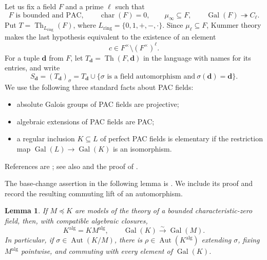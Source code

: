 \documentclass[11pt,a4paper]{amsart}
\newtheorem{lemma}[theorem]{Lemma}
\theoremstyle{definition}
\newcommand{\alg}{\mathrm{alg}}
\newcommand{\bd}{\boldsymbol d}
\DeclareMathOperator{\Gal}{Gal}
\DeclareMathOperator{\Aut}{Aut}
\DeclareMathOperator{\Th}{Th}
\begin{document}
Let us fix a field $F$ and a prime $\ell$ such that
\begin{equation}\label{b:eq:hyp}
F\text{ is bounded and PAC},\qquad
\operatorname{char}(F)=0,\qquad \mu_\infty\subseteq F,
\qquad \Gal(F)\twoheadrightarrow C_\ell.
\end{equation}
Put $T=\Th_{L_{\mathrm{ring}}}(F)$, where
$L_{\mathrm{ring}}=\{0,1,+,-,\cdot\}$. Since $\mu_\ell\subseteq F$,
Kummer theory makes the last hypothesis equivalent to the existence of
an element
\begin{equation}\label{b:eq:c}
c\in F^\times\setminus(F^\times)^\ell.
\end{equation}
For a tuple $\bd$ from $F$, let $T_{\bd}=\Th(F,\bd)$ in the language
with names for its entries, and write
\[
S_{\bd}=(T_{\bd})_\sigma
=T_{\bd}\cup\{\sigma\text{ is a field automorphism and}\ \sigma(\bd)=\bd\}.
\]
We use the following three standard facts about PAC fields:
\begin{itemize}
  \item absolute Galois groups of PAC
fields are projective;
  \item algebraic extensions of PAC fields are PAC;
  \item a regular inclusion $K\subseteq L$ of perfect PAC fields is elementary if the
restriction map $\Gal(L)\to\Gal(K)$ is an isomorphism.
\end{itemize}
References are \cite[Corollary 11.2.5, Theorem 11.6.2, Corollary 20.3.4]{FJ}; see also \cite[Section 4.3]{CP} and the proof of \cite[Theorem 3.25]{HK}.

The base-change assertion in the following lemma is
\cite[Section~1.4, Fact~3]{BCGeometric}.
We include its proof and record the resulting
commuting lift of an automorphism.
\begin{lemma}\label{b:lem:basechange}
If $M\preccurlyeq K$ are models of the theory of a bounded
characteristic-zero field, then, with compatible algebraic closures,
\[
K^{\alg}=KM^{\alg},\qquad
\Gal(K)\xrightarrow{\sim}\Gal(M).
\]
In particular, if $\sigma\in\Aut(K/M)$, there is
$\rho\in\Aut(K^{\alg})$ extending $\sigma$, fixing $M^{\alg}$
pointwise, and commuting with every element of $\Gal(K)$.
\end{lemma}
\end{document}
